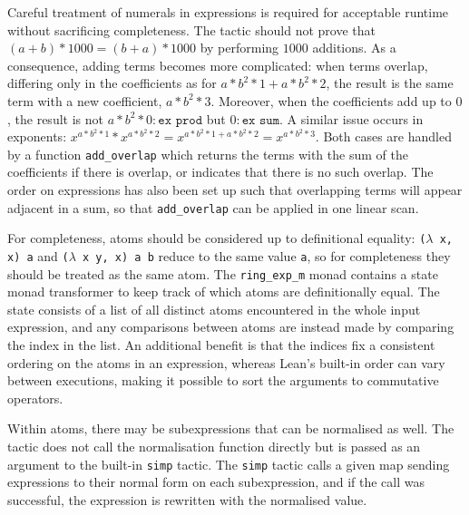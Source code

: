 \documentclass{llncs}
\newcommand{\lean}[1]{\texttt{#1}\xspace} %
\newcommand{\ringexp}{\lean{ring\_exp}}
\begin{document}
Careful treatment of numerals in expressions is required for acceptable runtime without sacrificing completeness.
The tactic should not prove that $(a + b) * 1000 = (b + a) * 1000$ by performing $1000$ additions.
As a consequence, adding terms becomes more complicated:
when terms overlap, differing only in the coefficients as for $a * b^2 * 1 + a * b^2 * 2$,
the result is the same term with a new coefficient, $a * b^2 * 3$.
Moreover, when the coefficients add up to $0$, the result is not $a * b^2 * 0 : \lean{ex prod}$ but $0 : \lean{ex sum}$.
A similar issue occurs in exponents: $x ^ {a * b^2 * 1} * x ^ {a * b^2 * 2} = x ^ {a * b^2 * 1 + a * b^2 * 2} = x ^ {a * b^2 * 3}$.
Both cases are handled by a function \lean{add\_overlap} which returns the terms with the sum of the coefficients if there is overlap,
or indicates that there is no such overlap.
The order on expressions has also been set up such that overlapping terms will appear adjacent in a sum,
so that \lean{add\_overlap} can be applied in one linear scan.

For completeness, atoms should be considered up to definitional equality:
\lean{($\lambda$ x, x) a} and \lean{($\lambda$ x y, x) a b} reduce to the same value \lean{a},
so for completeness they should be treated as the same atom.
The \lean{ring\_exp\_m} monad contains a state monad transformer to keep track of which atoms are definitionally equal.
The state consists of a list of all distinct atoms encountered in the whole input expression,
and any comparisons between atoms are instead made by comparing the index in the list.
An additional benefit is that the indices fix a consistent ordering on the atoms in an expression,
whereas Lean's built-in order can vary between executions,
making it possible to sort the arguments to commutative operators.

Within atoms, there may be subexpressions that can be normalised as well.
The tactic does not call the normalisation function directly
but is passed as an argument to the built-in \lean{simp} tactic.
The \lean{simp} tactic calls a given map sending expressions to their normal form on each subexpression,
and if the call was successful, the expression is rewritten with the normalised value.
\end{document}
